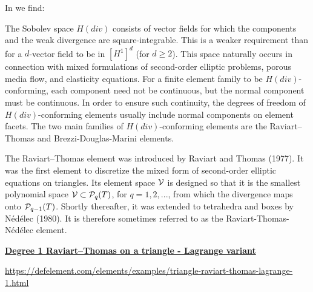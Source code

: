 In \textcite{lomw12} we find:
\begin{displayquote}
{\color{darkgray}
The Sobolev space $H(div)$ consists of vector fields for which the 
components and the weak divergence are square-integrable. This is a 
weaker requirement than for a $d$-vector field to be in $[H^1]^d$ (for $d\ge 2$).
This space naturally occurs in connection with mixed formulations 
of second-order elliptic problems,
porous media flow, and elasticity equations. For a finite element 
family to be $H(div)$-conforming, each component need not be continuous, 
but the normal component must be continuous. In order
to ensure such continuity, the degrees of freedom of $H(div)$-conforming 
elements usually include normal components on element facets.
The two main families of $H(div)$-conforming elements are the Raviart–Thomas 
and Brezzi-Douglas-Marini elements.

The Raviart–Thomas element was introduced by Raviart and Thomas (1977). 
It was the first element to discretize the mixed form of second-order 
elliptic equations on triangles. Its element space ${\cal V}$
is designed so that it is the smallest polynomial space 
${\cal V} \subset {\cal P}_q(T)$, for $q=1,2,...$, from which
the divergence maps onto ${\cal P}_{q-1}(T)$. 
Shortly thereafter, it was extended to tetrahedra and boxes by
Nédélec (1980). It is therefore sometimes referred to as the 
Raviart-Thomas-Nédélec element.
}
\end{displayquote}




\newpage
\noindent
\underline{\bf Degree 1 Raviart–Thomas on a triangle - Lagrange variant}

\url{https://defelement.com/elements/examples/triangle-raviart-thomas-lagrange-1.html}

